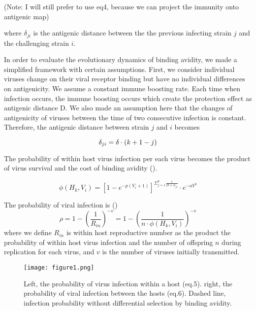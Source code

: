\documentclass{article}
\begin{document}
(Note: I will still prefer to use eq4, because we can project the immunity onto antigenic map)

where $\delta_{ji}$ is the antigenic distance between the the previous infecting strain $j$ and the challenging strain $i$.

In order to evaluate the evolutionary dynamics of binding avidity, we made a simplified framework with certain assumptions. First, we consider individual viruses change on their viral receptor binding but have no individual differences on antigenicity. We assume a constant immune boosting rate. Each time when infection occurs, the immune boosting occurs which create the protection effect as antigenic distance D. We also made an assumption here that the changes of antigenicity of viruses between the time of two consecutive infection is constant. Therefore, the antigenic distance between strain $j$ and $i$ becomes

\begin{equation}
 \delta_{ji} = \delta\cdot (k+1-j) \\
\end{equation}

The probability of within host virus infection per each virus becomes the product of virus survival and the cost of binding avidity (\citep{Yuan2013}). 

\begin{equation}
  \phi(H_{k},V_{i}) = [1-e^{-p(V_{i}+1)}]^{\Sigma_{j=1}^{k}\frac{1}{D+\alpha_{ji}}} \cdot e^{-aV^{b}}
\end{equation} 






The probability of viral infection is (\citep{Keeling2008})
\begin{equation}
\rho=1-(\frac{1}{R_{in}})^{-v}
=1-(\frac{1}{n \cdot \phi(H_{k},V_{i})})^{-v}
\end{equation}
where we define $R_{in}$ is within host reproductive number as the product the probability of within host virus infection and the number of offspring $n$ during replication for each virus, and $v$ is the number of viruses initially transmitted.   
 
\begin{figure}[h!]
        \texttt{[image: figure1.png]}
        \caption{Left, the probability of virus infection within a host (eq.5). right, the probability of viral infection between the hosts (eq.6). Dashed line, infection probability without differential selection by binding avidity. }
\end{figure}
\end{document}
